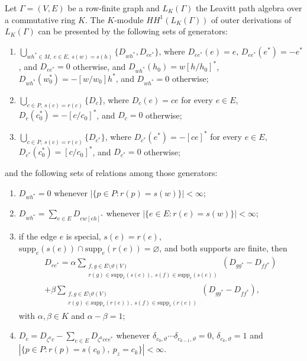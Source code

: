 \begin{theorem}\label{thm:leavitt:outer}
Let $\Gamma=(V,E)$ be a row-finite graph and $L_{K}(\Gamma)$ the Leavitt path
algebra over a commutative ring $K$. The $K$-module $HH^{1}(L_{K}(\Gamma))$ of outer
derivations of $L_{K}(\Gamma)$ can be presented by the following sets of generators:
\begin{enumerate}[label=(\arabic*)]
\item $\bigcup_{wh^{*}\in M,\ e\in E,\ s(w)=s(h)}\{D_{wh^{*}},D_{ee^{*}}\}$, where
$D_{ee^{*}}(e)=e$, $D_{ee^{*}}(e^{*})=-e^{*}$, and $D_{ee^{*}}=0$ otherwise, and
$D_{wh^{*}}(h_{0})=w[h/h_{0}]^{*}$, $D_{wh^{*}}(w_{0}^{*})=-[w/w_{0}]h^{*}$, and
$D_{wh^{*}}=0$ otherwise;
\item $\bigcup_{c\in P,\ s(c)=r(c)}\{D_{c}\}$, where $D_{c}(e)=ce$ for every $e\in E$,
$D_{c}(c_{0}^{*})=-[c/c_{0}]^{*}$, and $D_{c}=0$ otherwise;
\item $\bigcup_{c\in P,\ s(c)=r(c)}\{D_{c^{*}}\}$, where $D_{c^{*}}(e^{*})=-[ce]^{*}$
for every $e\in E$, $D_{c^{*}}(c_{0}^{*})=[c/c_{0}]^{*}$, and $D_{c^{*}}=0$ otherwise;
\end{enumerate}
and the following sets of relations among those generators:
\begin{enumerate}[label=(\arabic*)]
\item $D_{wh^{*}}=0$ whenever $|\{p\in P\colon r(p)=s(w)\}|<\infty$;
\item $D_{wh^{*}}=\sum_{e\in E}D_{ew[eh]^{*}}$ whenever
$|\{e\in E\colon r(e)=s(w)\}|<\infty$;
\item if the edge $e$ is special, $s(e)=r(e)$,
$\mathrm{supp}_{e}(s(e))\cap\mathrm{supp}_{e}(r(e))=\varnothing$, and both supports
are finite, then
\begin{multline*}
D_{ee^{*}}=\alpha\!\!\sum_{\substack{f,g\in E\setminus\vartheta(V)\\ r(g)\in\mathrm{supp}_{e}(s(e)),\ s(f)\in\mathrm{supp}_{e}(s(e))}}\!\!(D_{gg^{*}}-D_{f\!f^{*}})\\
+\beta\!\!\sum_{\substack{f,g\in E\setminus\vartheta(V)\\ r(g)\in\mathrm{supp}_{e}(r(e)),\ s(f)\in\mathrm{supp}_{e}(r(e))}}\!\!(D_{gg^{*}}-D_{f\!f^{*}}),
\end{multline*}
with $\alpha,\beta\in K$ and $\alpha-\beta=1$;
\item $D_{c}=D_{\zeta^{k}c}-\sum_{e\in E}D_{\zeta^{k}cee^{*}}$ whenever
$\delta_{c_{0},\vartheta}\cdots\delta_{c_{k-1},\vartheta}=0$,
$\delta_{c_{k},\vartheta}=1$ and $|\{p\in P\colon r(p)=s(c_{0}),\ p_{z}=c_{k}\}|<\infty$.
\end{enumerate}
\end{theorem}

